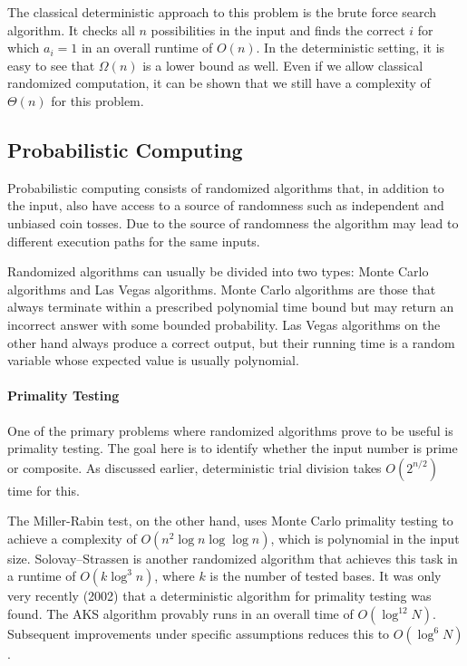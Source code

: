 The classical deterministic approach to this problem is the brute force search algorithm. It checks all \( n \) possibilities in the input and finds the correct \( i \) for which \( a_i = 1 \) in an overall runtime of \( O(n) \). In the deterministic setting, it is easy to see that $\Omega(n)$ is a lower bound as well. Even if we allow classical randomized computation, it can be shown that we still have a complexity of $\Theta(n)$ for this problem.

\subsection{Probabilistic Computing}

Probabilistic computing consists of randomized algorithms that, in addition to the input, also have access to a source of randomness such as independent and unbiased coin tosses. Due to the source of randomness the algorithm may lead to different execution paths for the same inputs.

Randomized algorithms can usually be divided into two types: Monte Carlo algorithms and Las Vegas algorithms. Monte Carlo algorithms are those that always terminate within a prescribed polynomial time bound but may return an incorrect answer with some bounded probability. Las Vegas algorithms on the other hand always produce a correct output, but their running time is a random variable whose expected value is usually polynomial.

\paragraph{Primality Testing}
One of the primary problems where randomized algorithms prove to be useful is primality testing. The goal here is to identify whether the input number is prime or composite. As discussed earlier, deterministic trial division takes \( O(2^{n/2}) \) time for this.

The Miller-Rabin test, on the other hand, uses Monte Carlo primality testing to achieve a complexity of \( O(n^{2} \log n \log \log n) \), which is polynomial in the input size. Solovay--Strassen \cite{SolovayStrassen77} is another randomized algorithm that achieves this task in a runtime of \( O(k \log^{3} n) \), where \( k \) is the number of tested bases. It was only very recently (2002) that a deterministic algorithm for primality testing was found. The AKS algorithm \cite{AKS04} provably runs in an overall time of \( O(\log^{12} N) \). Subsequent improvements under specific assumptions reduces this to \( O(\log^{6} N) \) \cite{LenstraPomerance19}.

